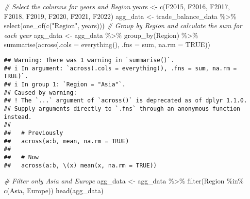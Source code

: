 \documentclass[
]{article}
\newenvironment{Shaded}{\begin{snugshade}}{\end{snugshade}}
\newcommand{\AttributeTok}[1]{\textcolor[rgb]{0.77,0.63,0.00}{#1}}
\newcommand{\CommentTok}[1]{\textcolor[rgb]{0.56,0.35,0.01}{\textit{#1}}}
\newcommand{\ConstantTok}[1]{\textcolor[rgb]{0.00,0.00,0.00}{#1}}
\newcommand{\FunctionTok}[1]{\textcolor[rgb]{0.00,0.00,0.00}{#1}}
\newcommand{\NormalTok}[1]{#1}
\newcommand{\OtherTok}[1]{\textcolor[rgb]{0.56,0.35,0.01}{#1}}
\newcommand{\SpecialCharTok}[1]{\textcolor[rgb]{0.00,0.00,0.00}{#1}}
\newcommand{\StringTok}[1]{\textcolor[rgb]{0.31,0.60,0.02}{#1}}
\begin{document}
\begin{Shaded}
\begin{Highlighting}[]
\CommentTok{\# Select the columns for years and Region}
\NormalTok{years }\OtherTok{\textless{}{-}} \FunctionTok{c}\NormalTok{(}\StringTok{\textquotesingle{}F2015\textquotesingle{}}\NormalTok{, }\StringTok{\textquotesingle{}F2016\textquotesingle{}}\NormalTok{, }\StringTok{\textquotesingle{}F2017\textquotesingle{}}\NormalTok{, }\StringTok{\textquotesingle{}F2018\textquotesingle{}}\NormalTok{, }\StringTok{\textquotesingle{}F2019\textquotesingle{}}\NormalTok{, }\StringTok{\textquotesingle{}F2020\textquotesingle{}}\NormalTok{, }\StringTok{\textquotesingle{}F2021\textquotesingle{}}\NormalTok{, }\StringTok{\textquotesingle{}F2022\textquotesingle{}}\NormalTok{)}
\NormalTok{agg\_data }\OtherTok{\textless{}{-}}\NormalTok{ trade\_balance\_data }\SpecialCharTok{\%\textgreater{}\%}
  \FunctionTok{select}\NormalTok{(}\FunctionTok{one\_of}\NormalTok{(}\FunctionTok{c}\NormalTok{(}\StringTok{"Region"}\NormalTok{, years)))}
\CommentTok{\# Group by \textquotesingle{}Region\textquotesingle{} and calculate the sum for each year}
\NormalTok{agg\_data }\OtherTok{\textless{}{-}}\NormalTok{ agg\_data }\SpecialCharTok{\%\textgreater{}\%}
  \FunctionTok{group\_by}\NormalTok{(Region) }\SpecialCharTok{\%\textgreater{}\%}
  \FunctionTok{summarise}\NormalTok{(}\FunctionTok{across}\NormalTok{(}\AttributeTok{.cols =} \FunctionTok{everything}\NormalTok{(), }\AttributeTok{.fns =}\NormalTok{ sum, }\AttributeTok{na.rm =} \ConstantTok{TRUE}\NormalTok{))}
\end{Highlighting}
\end{Shaded}

\begin{verbatim}
## Warning: There was 1 warning in `summarise()`.
## i In argument: `across(.cols = everything(), .fns = sum, na.rm = TRUE)`.
## i In group 1: `Region = "Asia"`.
## Caused by warning:
## ! The `...` argument of `across()` is deprecated as of dplyr 1.1.0.
## Supply arguments directly to `.fns` through an anonymous function instead.
## 
##   # Previously
##   across(a:b, mean, na.rm = TRUE)
## 
##   # Now
##   across(a:b, \(x) mean(x, na.rm = TRUE))
\end{verbatim}

\begin{Shaded}
\begin{Highlighting}[]
\CommentTok{\# Filter only \textquotesingle{}Asia\textquotesingle{} and \textquotesingle{}Europe\textquotesingle{}}
\NormalTok{agg\_data }\OtherTok{\textless{}{-}}\NormalTok{ agg\_data }\SpecialCharTok{\%\textgreater{}\%}
  \FunctionTok{filter}\NormalTok{(Region }\SpecialCharTok{\%in\%} \FunctionTok{c}\NormalTok{(}\StringTok{\textquotesingle{}Asia\textquotesingle{}}\NormalTok{, }\StringTok{\textquotesingle{}Europe\textquotesingle{}}\NormalTok{))}
\FunctionTok{head}\NormalTok{(agg\_data)}
\end{Highlighting}
\end{Shaded}
\end{document}
